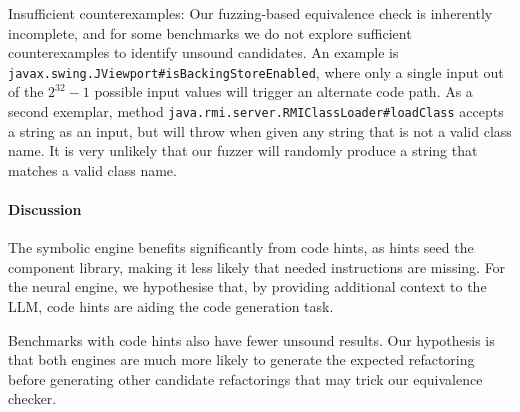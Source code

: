 \documentclass[conference]{IEEEtran}
\begin{document}
Insufficient counterexamples: Our fuzzing-based equivalence check is inherently
incomplete, and for some benchmarks we do not explore sufficient counterexamples
to identify unsound candidates. An example 
is \lstinline[breaklines=true]{javax.swing.JViewport#isBackingStoreEnabled}, where only a single input
out of the $2^{32}-1$ possible input values will trigger an alternate code path.
As a second exemplar, method \lstinline[breaklines=true]{java.rmi.server.RMIClassLoader#loadClass}
accepts a string as an input, but will throw when given any string
that is not a valid class name. %
It is very unlikely that our fuzzer will randomly produce a string that matches a valid class
name.

\paragraph{Discussion}

The symbolic engine benefits significantly from code hints, as hints seed
the component library, making it less likely that needed instructions are
missing.  For the neural engine, we hypothesise that, by providing
additional context to the LLM, code hints are aiding the code generation
task.

Benchmarks with code hints also have fewer unsound results.  Our hypothesis
is that both engines are much more likely to generate the expected
refactoring before generating other candidate refactorings that may trick
our equivalence checker.

%
%
%
%
\end{document}
